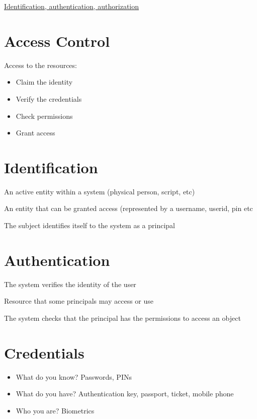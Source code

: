 \documentclass{article}[18pt]
\begin{document}
\begin{center}
\underline{\huge Identification, authentication, authorization}
\end{center}
\section{Access Control}
Access to the resources:
\begin{itemize}
	\item Claim the identity
	\item Verify the credentials
	\item Check permissions
	\item Grant access
\end{itemize}
\section{Identification}
\begin{defin}[Subject]
An active entity within a system (physical person, script, etc)	
\end{defin}
\begin{defin}[Principal]
An entity that can be granted access (represented by a username, userid, pin etc
\end{defin}
The subject identifies itself to the system as a principal
\section{Authentication}
The system verifies the identity of the user
\begin{defin}[Object]
Resource that some principals may access or use
\end{defin}
The system checks that the principal has the permissions to access an object
\section{Credentials}
\begin{itemize}
	\item What do you know? Passwords, PINs
	\item What do you have? Authentication key, passport, ticket, mobile phone
	\item Who you are? Biometrics
\end{itemize}
\end{document}
